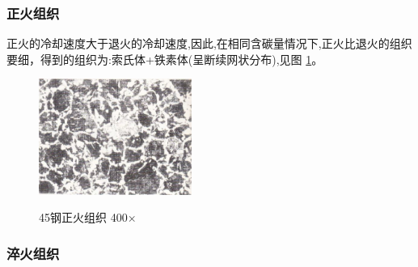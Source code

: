 \documentclass[12pt]{ctexart}
\begin{document}
\subsubsection{正火组织}
正火的冷却速度大于退火的冷却速度,因此,在相同含碳量情况下,正火比退火的组织要细，得到的组织为:索氏体+铁素体(呈断续网状分布),见图 \ref{zhenghuo}。
\begin{figure}[ht!]
  \centering
  \includegraphics[width=5cm]{zhenghuo.jpg}\\
  \caption{45钢正火组织 400×}\label{zhenghuo}
\end{figure}

\subsubsection{淬火组织}
\end{document}
